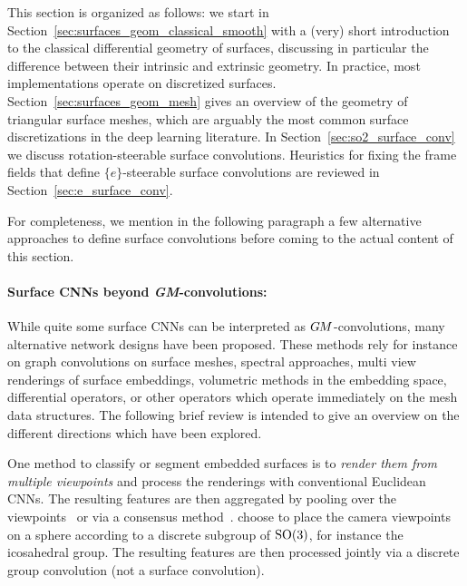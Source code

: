 \etocsettocstyle{}{} %
\localtableofcontents


This section is organized as follows:
we start in Section~\ref{sec:surfaces_geom_classical_smooth} with a (very) short introduction to the classical differential geometry of surfaces, discussing in particular the difference between their intrinsic and extrinsic geometry.
In practice, most implementations operate on discretized surfaces.
Section~\ref{sec:surfaces_geom_mesh} gives an overview of the geometry of triangular surface meshes, which are arguably the most common surface discretizations in the deep learning literature.
In Section~\ref{sec:so2_surface_conv} we discuss rotation-steerable surface convolutions.
Heuristics for fixing the frame fields that define $\{e\}$-steerable surface convolutions are reviewed in Section~\ref{sec:e_surface_conv}.














For completeness, we mention in the following paragraph a few alternative approaches to define surface convolutions
before coming to the actual content of this section.

\paragraph{Surface CNNs beyond \textit{GM}-convolutions:}

While quite some surface CNNs can be interpreted as $G\mkern-1.4muM$-convolutions, many alternative network designs have been proposed.
These methods rely for instance on
graph convolutions on surface meshes,
spectral approaches,
multi view renderings of surface embeddings,
volumetric methods in the embedding space,
differential operators,
or other operators which operate immediately on the mesh data structures.
The following brief review is intended to give an overview on the different directions which have been explored.


One method to classify or segment embedded surfaces is to \emph{render them from multiple viewpoints} and process the renderings with conventional Euclidean CNNs.
The resulting features are then aggregated by
pooling over the viewpoints~\cite{su2015multi,qi2016volumetric}
or via a consensus method~\cite{paulsen2018multi}.
\citet{esteves2019multiView} choose to place the camera viewpoints on a sphere according to a discrete subgroup of $\operatorname{SO}(3)$, for instance the icosahedral group.
The resulting features are then processed jointly via a discrete group convolution (not a surface convolution).


